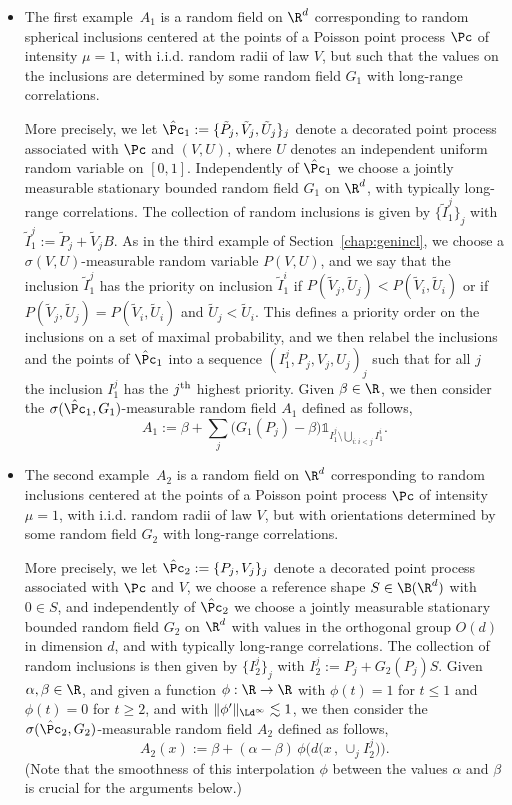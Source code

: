 \begin{itemize}
\item The first example~$A_1$ is a random field on $\R^d$ corresponding to random spherical inclusions centered at the points of a Poisson point process $\Pc$ of intensity $\mu=1$, with i.i.d. random radii of law $V$, but such that the values on the inclusions are determined by some random field $G_1$ with long-range correlations.

More precisely, we let $\hat\Pc_1:=\{\tilde P_j,\tilde V_j,\tilde U_j\}_j$ denote a decorated point process associated with $\Pc$ and $(V,U)$, where $U$ denotes an independent uniform random variable on $[0,1]$. Independently of $\hat\Pc_1$ we choose a jointly measurable stationary bounded random field $G_1$ on $\R^d$, with typically long-range correlations. The collection of random inclusions is given by $\{\tilde I_1^j\}_j$ with $\tilde I_1^j:=\tilde P_j+\tilde V_jB$. As in the third example of Section~\ref{chap:genincl}, we choose a $\sigma(V,U)$-measurable random variable $P(V,U)$, and we say that the inclusion $\tilde I_1^j$ has the priority on inclusion $\tilde I_1^i$ if $P(\tilde V_j,\tilde U_j)<P(\tilde V_i,\tilde U_i)$ or if $P(\tilde V_j,\tilde U_j)=P(\tilde V_i,\tilde U_i)$ and $\tilde U_j<\tilde U_i$. This defines a priority order on the inclusions on a set of maximal probability, and we then relabel the inclusions and the points of $\hat\Pc_1$ into a sequence $(I_1^j, P_j,V_j,U_j)_j$ such that for all $j$ the inclusion $I_1^j$ has the $j^{\rm th}$ highest priority. Given $\beta\in\R$, we then consider the $\sigma(\hat\Pc_1,G_1)$-measurable random field $A_1$ defined as follows,
\[
A_1:=\beta+\sum_j\big(G_1(P_j)-\beta\big)\mathds1_{I_1^j\setminus\bigcup_{i:i<j}I_1^i}.
\]
\item The second example~$A_2$ is a random field on $\R^d$ corresponding to random inclusions centered at the points of a Poisson point process $\Pc$ of intensity $\mu=1$, with i.i.d. random radii of law $V$, but with orientations determined by some random field $G_2$ with long-range correlations.

More precisely, we let $\hat\Pc_2:=\{P_j,V_j\}_j$ denote a decorated point process associated with $\Pc$ and $V$, we choose a reference shape $S\in\B(\R^d)$ with $0\in S$, and independently of $\hat\Pc_2$ we choose a jointly measurable stationary bounded random field $G_2$ on $\R^d$ with values in the orthogonal group $O(d)$ in dimension $d$, and with typically long-range correlations. The collection of random inclusions is then given by $\{I_2^j\}_j$ with $I_2^j:=P_j+G_2(P_j) S$. Given $\alpha,\beta\in\R$, and given a function $\phi:\R\to\R$ with $\phi(t)=1$ for $t\le1$ and $\phi(t)=0$ for $t\ge2$, and with $\|\phi'\|_{\Ld^\infty}\lesssim1$, we then consider the $\sigma(\hat\Pc_2,G_2)$-measurable random field $A_2$ defined as follows,
\[
A_2(x):=\beta+(\alpha-\beta)\,\phi\Big(d\big(x\,,\,\cup_jI_2^j\big)\Big).
\]
(Note that the smoothness of this interpolation $\phi$ between the values $\alpha$ and $\beta$ is crucial for the arguments below.)


\end{itemize}
